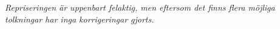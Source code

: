 \vspace{5mm}
\textit{
Repriseringen är uppenbart felaktig, men eftersom det finns flera möjliga
tolkningar har inga korrigeringar gjorts.
}